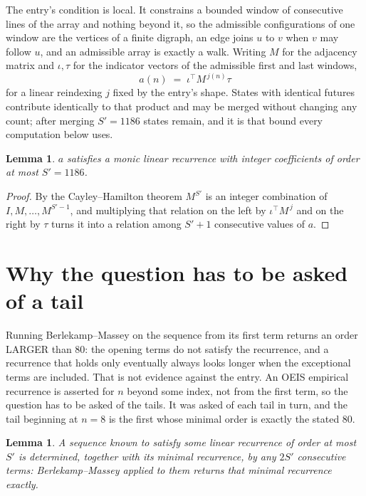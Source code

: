 \documentclass[11pt,a4paper]{article}
\theoremstyle{plain}
\newtheorem{lemma}[theorem]{Lemma}
\theoremstyle{definition}
\begin{document}
The entry's condition is local. It constrains a bounded window of consecutive lines of the
array and nothing beyond it, so the admissible configurations of one window are the vertices of
a finite digraph, an edge joins $u$ to $v$ when $v$ may follow $u$, and an admissible array is
exactly a walk. Writing $M$ for the adjacency matrix and $\iota,\tau$ for the indicator vectors
of the admissible first and last windows,
\[
a(n)\;=\;\iota^{\!\top}M^{\,j(n)}\tau
\]
for a linear reindexing $j$ fixed by the entry's shape. States with identical futures
contribute identically to that product and may be merged without changing any count; after
merging $S'=1186$ states remain, and it is that bound every computation below uses.

\begin{lemma}\label{lem:cf}
$a$ satisfies a monic linear recurrence with integer coefficients of order at most $S'=1186$.
\end{lemma}

\begin{proof}
By the Cayley--Hamilton theorem $M^{S'}$ is an integer combination of $I,M,\dots,M^{S'-1}$,
and multiplying that relation on the left by $\iota^{\!\top}M^{\,j}$ and on the right by
$\tau$ turns it into a relation among $S'+1$ consecutive values of $a$.
\end{proof}

\section{Why the question has to be asked of a tail}

Running Berlekamp--Massey on the sequence from its first term returns an order LARGER than $80$: the opening terms do not satisfy the recurrence, and a recurrence that holds only eventually always looks longer when the exceptional terms are included. That is not evidence against the entry. An OEIS empirical recurrence is asserted for $n$ beyond some index, not from the first term, so the question has to be asked of the tails. It was asked of each tail in turn, and the tail beginning at $n=8$ is the first whose minimal order is exactly the stated $80$.

\begin{lemma}\label{lem:bm}
A sequence known to satisfy some linear recurrence of order at most $S'$ is determined,
together with its minimal recurrence, by any $2S'$ consecutive terms: Berlekamp--Massey applied
to them returns that minimal recurrence exactly.
\end{lemma}
\end{document}
